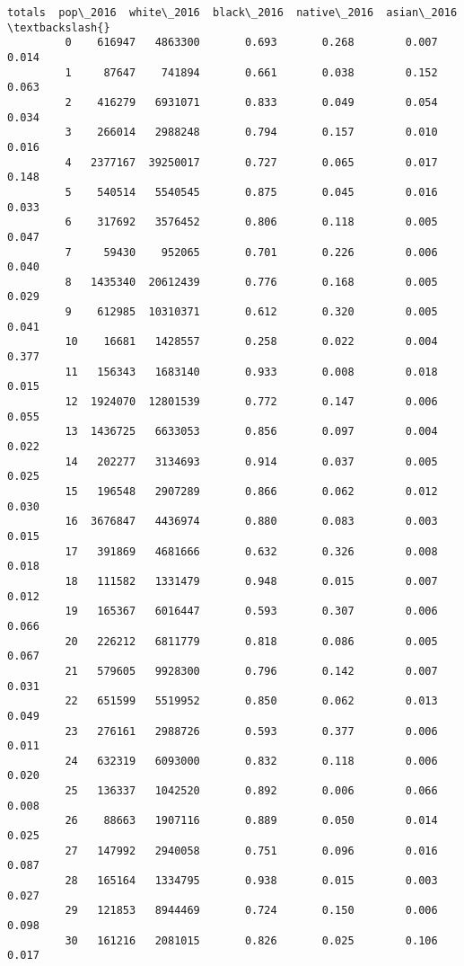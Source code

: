 \documentclass[11pt]{article}
\begin{document}
\begin{Verbatim}[commandchars=\\\{\}]
              totals  pop\_2016  white\_2016  black\_2016  native\_2016  asian\_2016  \textbackslash{}
         0    616947   4863300       0.693       0.268        0.007       0.014   
         1     87647    741894       0.661       0.038        0.152       0.063   
         2    416279   6931071       0.833       0.049        0.054       0.034   
         3    266014   2988248       0.794       0.157        0.010       0.016   
         4   2377167  39250017       0.727       0.065        0.017       0.148   
         5    540514   5540545       0.875       0.045        0.016       0.033   
         6    317692   3576452       0.806       0.118        0.005       0.047   
         7     59430    952065       0.701       0.226        0.006       0.040   
         8   1435340  20612439       0.776       0.168        0.005       0.029   
         9    612985  10310371       0.612       0.320        0.005       0.041   
         10    16681   1428557       0.258       0.022        0.004       0.377   
         11   156343   1683140       0.933       0.008        0.018       0.015   
         12  1924070  12801539       0.772       0.147        0.006       0.055   
         13  1436725   6633053       0.856       0.097        0.004       0.022   
         14   202277   3134693       0.914       0.037        0.005       0.025   
         15   196548   2907289       0.866       0.062        0.012       0.030   
         16  3676847   4436974       0.880       0.083        0.003       0.015   
         17   391869   4681666       0.632       0.326        0.008       0.018   
         18   111582   1331479       0.948       0.015        0.007       0.012   
         19   165367   6016447       0.593       0.307        0.006       0.066   
         20   226212   6811779       0.818       0.086        0.005       0.067   
         21   579605   9928300       0.796       0.142        0.007       0.031   
         22   651599   5519952       0.850       0.062        0.013       0.049   
         23   276161   2988726       0.593       0.377        0.006       0.011   
         24   632319   6093000       0.832       0.118        0.006       0.020   
         25   136337   1042520       0.892       0.006        0.066       0.008   
         26    88663   1907116       0.889       0.050        0.014       0.025   
         27   147992   2940058       0.751       0.096        0.016       0.087   
         28   165164   1334795       0.938       0.015        0.003       0.027   
         29   121853   8944469       0.724       0.150        0.006       0.098   
         30   161216   2081015       0.826       0.025        0.106       0.017   

\end{Verbatim}
\end{document}

